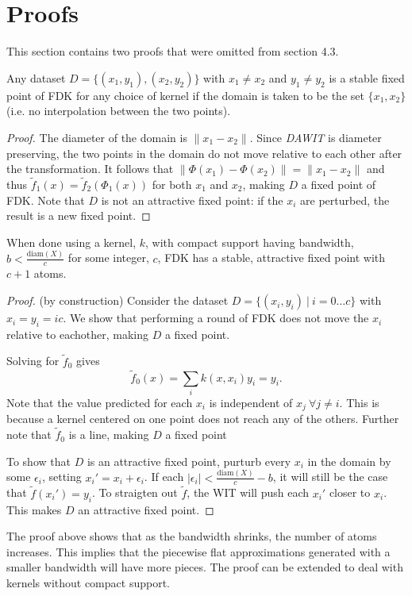 \chapter{Proofs}
This section contains two proofs that were omitted from section 4.3.

\begin{claim}Any dataset $D = \{(x_1, y_1), (x_2, y_2)\}$ with $x_1 \neq x_2$
and $y_1 \neq y_2$ is a stable fixed point of FDK for any choice of kernel if
the
domain is taken to be the set $\{x_1, x_2\}$ (i.e. no
interpolation between the two points).\end{claim}

\begin{proof}The diameter of the domain is $\|x_1 - x_2\|$. Since
\textit{DAWIT} is diameter preserving, the two points in the domain do not
move relative to each other after the transformation.
It follows that $\|\Phi(x_1) - \Phi(x_2)\| = \|x_1 - x_2\|$ and thus
$\tilde f_1(x) = \tilde f_2(\Phi_1(x))$ for both $x_1$ and
$x_2$, making $D$ a fixed point of FDK.
Note that $D$ is not an attractive fixed point: if the
$x_i$ are perturbed, the result is a new fixed point.\end{proof}

\begin{claim}When done using a kernel, $k$, with compact support having
bandwidth,
$b < \frac{\mathrm{diam}(X)}{c}$ for some integer, $c$, FDK has a stable, attractive fixed point with
$c + 1$ atoms.\end{claim}

\begin{proof}(by construction)
Consider the dataset $D = \{(x_i,y_i)\ |\ i = 0\ldots c\}$ with $x_i = y_i = ic$.
We show that performing a round of FDK does not move the $x_i$ relative to
eachother, making $D$ a fixed point.

Solving for $\tilde f_0$ gives $$\tilde f_0(x) = \sum_i k(x,x_i)y_i = y_i.$$
Note that the value predicted for each $x_i$ is independent of $x_j\ \forall
j\neq i$. This is because a kernel centered on one point does not reach any
of the others.
Further note that $\tilde f_0$ is a line, making $D$ a fixed point 

To show that $D$ is an attractive fixed point, purturb every $x_i$ in the
domain by some $\epsilon_i$, setting $x_i' = x_i + \epsilon_i$.
If each $|\epsilon_i| < \frac{\mathrm{diam}(X)}{c} - b$,
it will still be the case that $\tilde f(x_i') = y_i$.
To straigten out $\tilde f$, the WIT will push each $x_i'$ closer to $x_i$.
This makes $D$ an attractive fixed point.
\end{proof}

The proof above shows that as the bandwidth shrinks, the number of atoms
increases.
This implies that the piecewise flat approximations generated with a
smaller bandwidth will have more pieces.
The proof can be extended to deal with kernels without compact support.

\clearpage
\newpage
